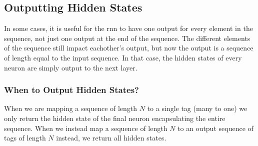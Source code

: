     \subsection{Outputting Hidden States \label{ssec: outputting hidden states}}
    In some cases, it is useful for the \gls{rnn} to have one output for every element in the sequence, not just one output at the end of the sequence. The different elements of the sequence still impact eachother's output, but now the output is a sequence of length equal to the input sequence. In that case, the hidden states of every \gls{neuron} are simply output to the next layer\cite{mlTextbook}.

    \subsubsection{When to Output Hidden States?}


    When we are mapping a sequence of length $N$ to a single tag (many to one) we only return the hidden state of the final \gls{neuron} encapsulating the entire sequence. When we instead map a sequence of length $N$ to an output sequence of tags of length $N$ instead, we return all hidden states.
